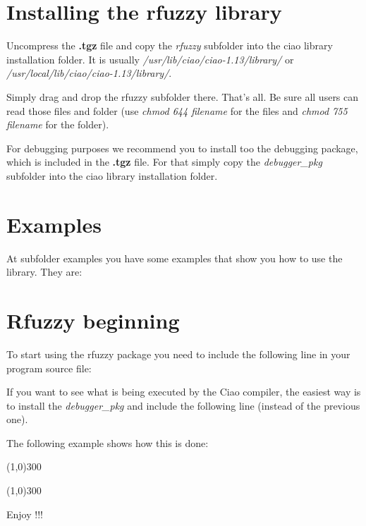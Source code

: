 \section{Installing the rfuzzy library}

Uncompress the \textbf{.tgz} file and copy the {\it rfuzzy} subfolder 
into the ciao library installation folder.
It is usually {\it /usr/lib/ciao/ciao-1.13/library/} or
{\it /usr/local/lib/ciao/ciao-1.13/library/}. 

Simply drag and drop the rfuzzy subfolder there. That's all. 
Be sure all users can read those files and folder 
(use {\it chmod 644 filename} for the files 
and {\it chmod 755 filename} for the folder). 

For debugging purposes we recommend you to install too the 
debugging package, which is included in the \textbf{.tgz} file.
For that simply copy the {\it debugger\_pkg} subfolder 
into the ciao library installation folder.

\section{Examples}

At subfolder examples you have some examples that show you how to use the library.
They are:


\section{Rfuzzy beginning}

To start using the rfuzzy package you need to include the following line
in your program source file: 


If you want to see what is being executed by the Ciao compiler, 
the easiest way is to install the {\it debugger\_pkg} and 
include the following line (instead of the previous one).


The following example shows how this is done:

\line(1,0){300}

\line(1,0){300}

Enjoy !!!


